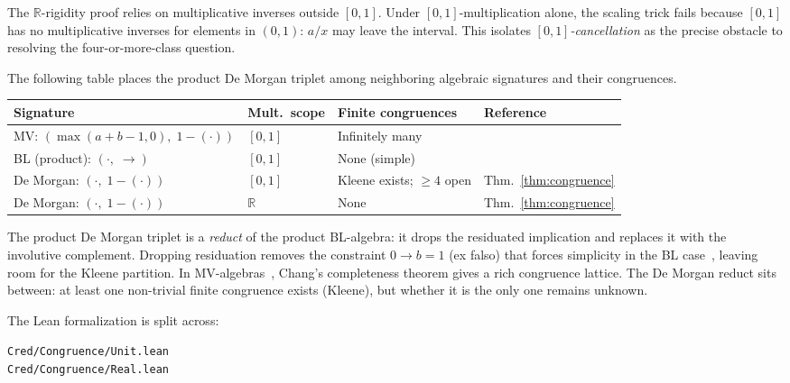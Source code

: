 \documentclass[11pt,a4paper]{article}
\newcommand{\Real}{\mathbb{R}}
\begin{document}
The $\Real$-rigidity proof relies on multiplicative inverses
outside $[0,1]$.
Under $[0,1]$-multiplication alone, the scaling trick fails because
$[0,1]$ has no multiplicative inverses for elements in $(0,1)$:
$a/x$ may leave the interval.
This isolates \emph{$[0,1]$-cancellation} as the precise obstacle
to resolving the four-or-more-class question.

The following table places the product De Morgan triplet among
neighboring algebraic signatures and their congruences.

\begin{center}
\small
\begin{tabular}{llll}
\toprule
\textbf{Signature} & \textbf{Mult.\ scope}
  & \textbf{Finite congruences} & \textbf{Reference} \\
\midrule
MV: $(\max(a{+}b{-}1,0),\; 1{-}(\cdot))$
  & $[0,1]$ & Infinitely many
  & \cite{cignoli2000,mundici2011} \\
BL (product): $({\cdot},\; {\to})$
  & $[0,1]$ & None (simple)
  & \cite{agliano2003} \\
De Morgan: $({\cdot},\; 1{-}(\cdot))$
  & $[0,1]$ & Kleene exists; $\geq\!4$ open
  & Thm.~\ref{thm:congruence} \\
De Morgan: $({\cdot},\; 1{-}(\cdot))$
  & $\Real$ & None
  & Thm.~\ref{thm:congruence} \\
\bottomrule
\end{tabular}
\normalsize
\end{center}
\smallskip
\noindent
The product De Morgan triplet is a \emph{reduct} of the product
BL-algebra: it drops the residuated implication and replaces it with
the involutive complement.
Dropping residuation removes the constraint $0 \to b = 1$ (ex falso)
that forces simplicity in the BL
case~\cite{agliano2003,galatos2007}, leaving room for the Kleene
partition.
In MV-algebras~\cite{cignoli2000,mundici2011}, Chang's completeness
theorem gives a rich congruence lattice.
The De Morgan reduct sits between: at least one non-trivial finite
congruence exists (Kleene), but whether it is the only one remains
unknown.

The Lean formalization is split across:
\begin{center}
\small
\texttt{Cred/Congruence/Unit.lean}\\
\texttt{Cred/Congruence/Real.lean}
\end{center}
\end{document}
